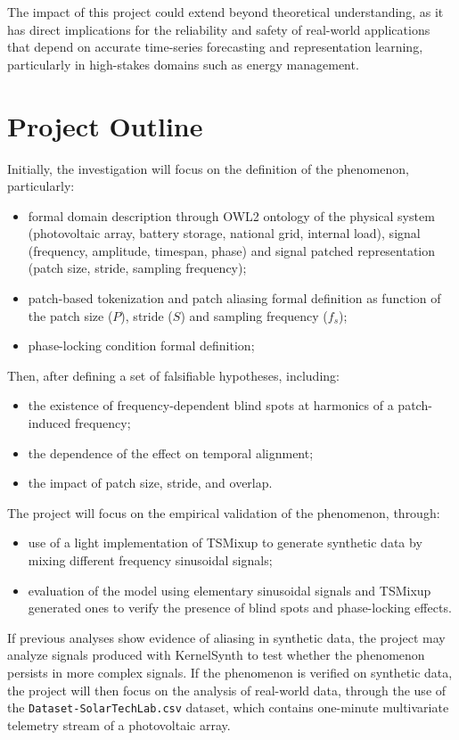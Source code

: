 The impact of this project could extend beyond theoretical understanding, as it has direct implications for the reliability and safety of real-world applications that depend on accurate time-series forecasting and representation learning, particularly in high-stakes domains such as energy management.

\section{Project Outline}
Initially, the investigation will focus on the definition of the phenomenon, particularly:
\begin{itemize}
    \item formal domain description through OWL2 ontology of the physical system (photovoltaic array, battery storage, national grid, internal load), signal (frequency, amplitude, timespan, phase) and signal patched representation (patch size, stride, sampling frequency);
    \item patch-based tokenization and patch aliasing formal definition as function of the patch size ($P$), stride ($S$) and sampling frequency ($f_s$);
    \item phase-locking condition formal definition;
\end{itemize}

Then, after defining a set of falsifiable hypotheses, including:
\begin{itemize}
    \item the existence of frequency-dependent blind spots at harmonics of a patch-induced frequency;
    \item the dependence of the effect on temporal alignment;
    \item the impact of patch size, stride, and overlap.
\end{itemize}

The project will focus on the empirical validation of the phenomenon, through:
\begin{itemize}
    \item use of a light implementation of TSMixup \cite{ansariChronosLearningLanguage2024} to generate synthetic data by mixing different frequency sinusoidal signals;
    \item evaluation of the model using elementary sinusoidal signals and TSMixup generated ones to verify the presence of blind spots and phase-locking effects. 
\end{itemize}

If previous analyses show evidence of aliasing in synthetic data, the project may analyze signals produced with KernelSynth \cite{ansariChronosLearningLanguage2024} to test whether the phenomenon persists in more complex signals. If the phenomenon is verified on synthetic data, the project will then focus on the analysis of real-world data, through the use of the \texttt{Dataset-SolarTechLab.csv} dataset, which contains one-minute multivariate telemetry stream of a photovoltaic array. \cite{levaPhotovoltaicPowerWeather2020}

